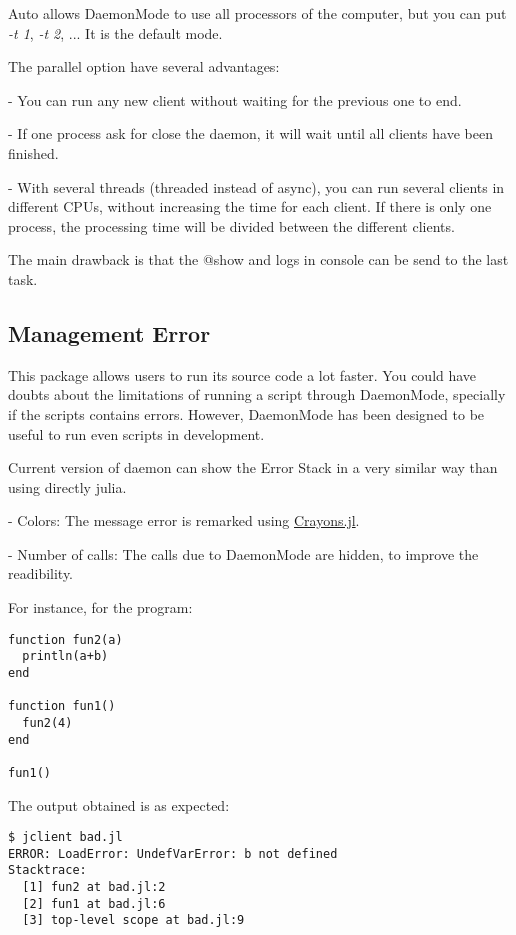 \documentclass{juliacon}
\begin{document}
Auto allows DaemonMode to use all processors of the computer, but you can put
\textit{-t 1}, \textit{-t 2}, ... It is the default mode.


The parallel option have several advantages:

- You can run any new client without waiting for the previous one to end.

- If one process ask for close the daemon, it will wait until all clients have
  been finished.
  
- With several threads (threaded instead of async), you can run several clients in
  different CPUs, without increasing the time for each client. If there is only
  one process, the processing time will be divided between the different
  clients.
 
The main drawback is that the @show and logs in console can be send to the last task.

\subsection{Management Error}

This package allows users to run its source code a lot faster. You could
have doubts about the limitations of running a script through DaemonMode,
specially if the scripts contains errors.
However, DaemonMode has been designed to be useful to run even scripts in development.

Current version of daemon can show the Error Stack in a very similar way than
using directly julia. 

- Colors: The message error is remarked using
\href{https://github.com/KristofferC/Crayons.jl}{Crayons.jl}. 

- Number of calls: The calls due to DaemonMode are hidden, to improve  the readibility.

For instance, for the program:

\begin{lstlisting}
function fun2(a)
  println(a+b)
end

function fun1()
  fun2(4)
end

fun1()
\end{lstlisting}

The output obtained is as expected:

\begin{lstlisting}
$ jclient bad.jl
ERROR: LoadError: UndefVarError: b not defined
Stacktrace:
  [1] fun2 at bad.jl:2
  [2] fun1 at bad.jl:6
  [3] top-level scope at bad.jl:9 
\end{lstlisting}
\end{document}
